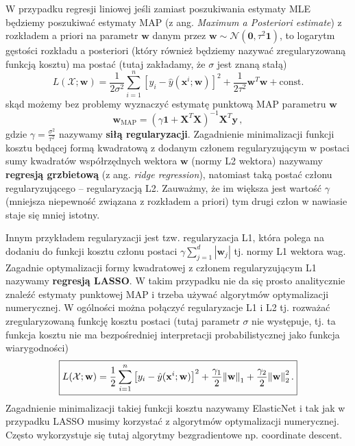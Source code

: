 \documentclass{myclass}
\numberwithin{equation}{subsection}
\begin{document}
W przypadku regresji liniowej jeśli zamiast poszukiwania estymaty MLE będziemy poszukiwać estymaty
MAP (z ang. \textit{Maximum a Posteriori estimate}) z rozkładem a priori na parametr \(\mathbf{w}\)
danym przez \(\mathbf{w} \sim \mathcal{N}(\mathbf{0}, \tau^{2}\mathbf{1})\), to logarytm gęstości
rozkładu a posteriori (który również będziemy nazywać zregularyzowaną funkcją kosztu) ma postać
(tutaj zakładamy, że \(\sigma\) jest znaną stałą)
\begin{equation}\boxed{
    L(\mathcal{X};\mathbf{w}) = \frac{1}{2\sigma^2}\sum_{i=1}^n\left[y_i - \hat{y}(\mathbf{x}^i;\mathbf{w})\right]^2 + \frac{1}{2\tau^2}\mathbf{w}^T\mathbf{w} + \mathrm{const.}
}\end{equation}
skąd możemy bez problemy wyznaczyć estymatę punktową MAP parametru \(\mathbf{w}\)
\begin{equation}
    \mathbf{w}_\mathrm{MAP} = \left(\gamma \mathbf{1} + \mathbf{X}^T\mathbf{X}\right)^{-1}\mathbf{X}^T\mathbf{y}\,,
\end{equation}
gdzie \(\gamma = \frac{\sigma^2}{\tau^2}\) nazywamy \textbf{siłą regularyzacji}. Zagadnienie
minimalizacji funkcji kosztu będącej formą kwadratową z dodanym członem regularyzującym w postaci
sumy kwadratów współrzędnych wektora \(\mathbf{w}\) (normy L2 wektora) nazywamy \textbf{regresją
grzbietową} (z ang. \textit{ridge regression}), natomiast taką postać członu regularyzującego --
regularyzacją L2. Zauważmy, że im większa jest wartość \(\gamma\) (mniejsza niepewność związana z
rozkładem a priori) tym drugi człon w nawiasie staje się mniej istotny.

Innym przykładem regularyzacji jest tzw. regularyzacja L1, która polega na dodaniu do funkcji kosztu
członu postaci \(\gamma \sum_{j=1}^d |\mathbf{w}_j|\) tj. normy L1 wektora wag. Zagadnie
optymalizacji formy kwadratowej z członem regularyzującym L1 nazywamy \textbf{regresją LASSO}. W
takim przypadku nie da się prosto analitycznie znaleźć estymaty punktowej MAP i trzeba używać
algorytmów optymalizacji numerycznej. W ogólności można połączyć regularyzacje L1 i L2 tj. rozważać
zregularyzowaną funkcję kosztu postaci (tutaj parametr \(\sigma\) nie występuje, tj. ta funkcja
kosztu nie ma bezpośredniej interpretacji probabilistycznej jako funkcja wiarygodności)
\begin{equation}\boxed{
    L(\mathcal{X};\mathbf{w}) = \frac{1}{2}\sum_{i=1}^n \left[y_i - \hat{y}(\mathbf{x}^i;\mathbf{w})\right]^2 + \frac{\gamma_1}{2}\norm{\mathbf{w}}_1 +  \frac{\gamma_2}{2}\norm{\mathbf{w}}_2^2\,.
}\end{equation}
Zagadnienie minimalizacji takiej funkcji kosztu nazywamy ElasticNet i tak jak w przypadku LASSO
musimy korzystać z algorytmów optymalizacji numerycznej. Często wykorzystuje się tutaj algorytmy
bezgradientowe np. coordinate descent.
\end{document}

